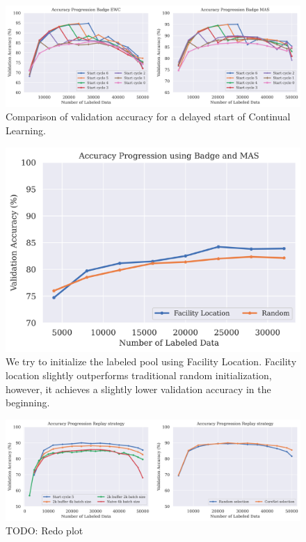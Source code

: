 \begin{figure}[h]
    \centering
    \includegraphics[width=\linewidth]{images/results_CAL/Delayed_start_CAL.png}
    \caption[Continual Active Learning Hybrid approach]{Comparison of validation accuracy for a delayed start of Continual Learning. }
    \label{fig:Evaluation:Results:CAL:DelayedStart}
\end{figure}




\begin{figure}[h]
    \centering
    \includegraphics[width=\linewidth]{images/results_CAL/Factility_location_init.png}
    \caption[Initialization using Facility Location]{We try to initialize the labeled pool using Facility Location. Facility location slightly outperforms traditional random initialization, however,
    it achieves a slightly lower validation accuracy in the beginning.}
    \label{fig:Evaluation:Results:CAL:FLinit}
\end{figure}


\begin{figure}[h]
    \centering
    \includegraphics[width=\linewidth]{images/results_CAL/replay_CAL.png}
    \caption[Continual Active Learning Custom Replay strategy]{TODO: Redo plot}
    \label{fig:Evaluation:Results:CAL:Replay}
\end{figure}

